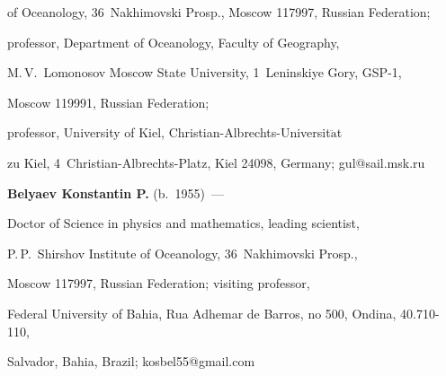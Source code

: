 of Oceanology, 36~Nakhimovski Prosp., Moscow 117997, Russian Federation; 


professor, Department of Oceanology, Faculty of Geography,


M.\,V.~Lomonosov Moscow State University, 1~Leninskiye Gory, GSP-1,


Moscow 119991, Russian Federation; 


professor, University of Kiel, Christian-Albrechts-Universit$\ddot{\mbox{a}}$t 


zu Kiel, 4~Christian-Albrechts-Platz, Kiel 24098, Germany; gul@sail.msk.ru





\vspace*{3pt}





\noindent


\textbf{Belyaev Konstantin P.} (b.\ 1955)~---


Doctor of Science in physics and mathematics, leading scientist, 


P.\,P.~Shirshov Institute of Oceanology, 36~Nakhimovski Prosp., 


Moscow 117997, Russian Federation; visiting professor, 


Federal University of Bahia, Rua Adhemar de Barros, no 500, Ondina, 40.710-110, 


Salvador, Bahia, Brazil; kosbel55@gmail.com


\label{end\stat}








\renewcommand{\bibname}{\protect\rm Литература}


